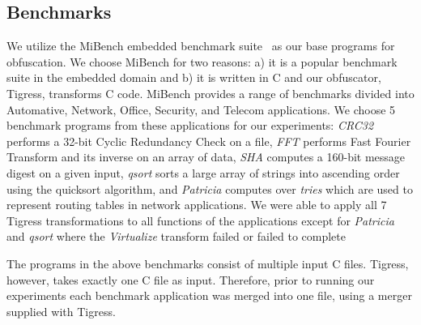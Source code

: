 \subsection{Benchmarks}
We utilize the MiBench embedded benchmark suite~\cite{guthaus2001mibench} as our base programs for obfuscation. We choose MiBench for two reasons: a) it is a popular benchmark suite in the embedded domain and b) it is written in C and our obfuscator, Tigress, transforms C code. MiBench provides a range of benchmarks divided into Automative, Network, Office, Security, and Telecom applications. We choose 5 benchmark programs from these applications for our experiments: \textit{CRC32} performs a 32-bit Cyclic Redundancy Check on a file, \textit{FFT} performs Fast Fourier Transform and its inverse on an array of data, \textit{SHA} computes a 160-bit message digest on a given input, \textit{qsort} sorts a large array of strings into ascending order using the quicksort algorithm, and \textit{Patricia} computes over {\em tries} which are used to represent routing tables in network applications.
We were able to apply all 7 Tigress transformations to all functions of the applications except for \textit{Patricia} and \textit{qsort} where the \textit{Virtualize} transform failed or failed to complete

The programs in the above benchmarks consist of multiple input C files. Tigress, however, takes  exactly one C file as input. Therefore, prior to running our experiments each benchmark application was merged into one file, using a merger supplied with Tigress.


